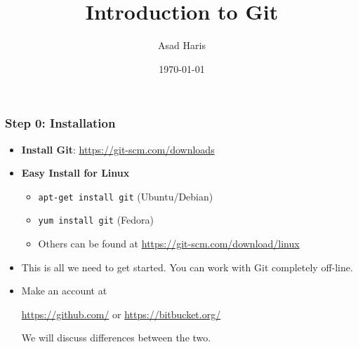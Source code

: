 \documentclass{beamer}
\title[\texttt{Intro to Git}]{Introduction to Git}
\author[Asad Haris]{Asad Haris}
\institute[Dept of Biostatistics]
{Department of Biostatistics \\
University of Washington\\
\medskip
}
\date{\today}
\begin{document}
\begin{frame}
\titlepage
\end{frame}

\begin{frame}
\frametitle{Step 0: Installation}
\begin{itemize}
\item \textbf{Install Git}: \url{https://git-scm.com/downloads}
\item \textbf{Easy Install for Linux}
\begin{itemize}
\item \texttt{apt-get install git} (Ubuntu/Debian)
\item \texttt{yum install git} (Fedora)
\item Others can be found at \url{https://git-scm.com/download/linux}
\end{itemize}

\item This is all we need to get started. You can work with Git completely off-line. 

\pause
\item Make an account at 

\url{https://github.com/} or \url{https://bitbucket.org/} 

We will discuss differences between the two. 
\end{itemize}



\end{frame}
\end{document}
